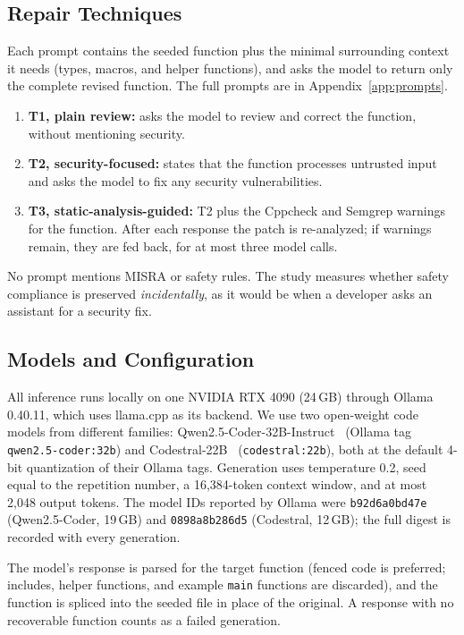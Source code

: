 \documentclass[12pt]{IEEEtran}
\begin{document}
\subsection{Repair Techniques}
Each prompt contains the seeded function plus the minimal surrounding context it needs (types, macros, and helper functions), and asks the model to return only the complete revised function. The full prompts are in Appendix~\ref{app:prompts}.
\begin{enumerate}
    \item \textbf{T1, plain review:} asks the model to review and correct the function, without mentioning security.
    \item \textbf{T2, security-focused:} states that the function processes untrusted input and asks the model to fix any security vulnerabilities.
    \item \textbf{T3, static-analysis-guided:} T2 plus the Cppcheck and Semgrep warnings for the function. After each response the patch is re-analyzed; if warnings remain, they are fed back, for at most three model calls.
\end{enumerate}
No prompt mentions MISRA or safety rules. The study measures whether safety compliance is preserved \emph{incidentally}, as it would be when a developer asks an assistant for a security fix.

\subsection{Models and Configuration}
All inference runs locally on one NVIDIA RTX 4090 (24\,GB) through Ollama 0.40.11, which uses llama.cpp as its backend. We use two open-weight code models from different families: Qwen2.5-Coder-32B-Instruct~\cite{qwen25coder} (Ollama tag \texttt{qwen2.5-coder:32b}) and Codestral-22B~\cite{codestral} (\texttt{codestral:22b}), both at the default 4-bit quantization of their Ollama tags. Generation uses temperature 0.2, seed equal to the repetition number, a 16,384-token context window, and at most 2,048 output tokens. The model IDs reported by Ollama were \texttt{b92d6a0bd47e} (Qwen2.5-Coder, 19\,GB) and \texttt{0898a8b286d5} (Codestral, 12\,GB); the full digest is recorded with every generation.

The model's response is parsed for the target function (fenced code is preferred; includes, helper functions, and example \texttt{main} functions are discarded), and the function is spliced into the seeded file in place of the original. A response with no recoverable function counts as a failed generation.
\end{document}
